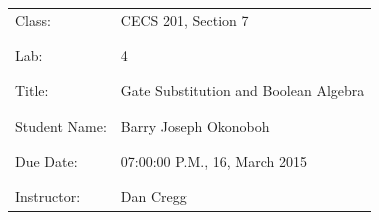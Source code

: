 \documentclass[9pt]{article}
\begin{document}
\vspace*{\fill}
\begin{center}
{\Huge \begin{tabular}{@{}ll@{}}
   Class: & CECS 201, Section 7 \\ \\ \\
   Lab: & 4 \\ \\ \\
   Title: & Gate Substitution and Boolean Algebra \\ \\ \\
   Student Name: & Barry Joseph Okonoboh \\ \\ \\
   Due Date: & 07:00:00 P.M., 16, March 2015 \\ \\ \\
   Instructor: & Dan Cregg
\end{tabular}}
\end{center}
\vspace*{\fill}
\newpage
\end{document}
